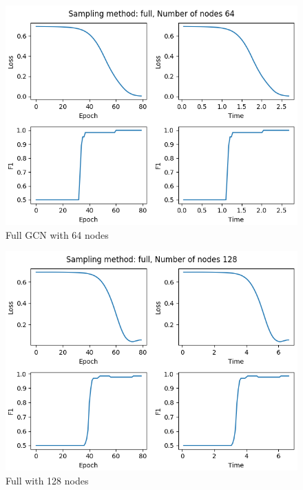\begin{figure}[H]
    \centering
    \includegraphics[scale=0.8, ]{assets/plots/full_64.png}
    \caption{Full GCN with 64 nodes}
\end{figure}

\begin{figure}[H]
    \centering
    \includegraphics[scale=0.8, ]{assets/plots/full_128.png}
    \caption{Full with 128 nodes}
\end{figure}

